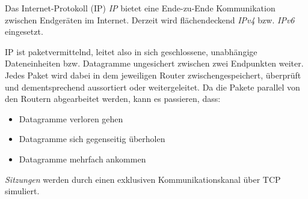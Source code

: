\begin{defi}{Das Internet-Protokoll (IP)}
    \emph{IP} bietet eine Ende-zu-Ende Kommunikation zwischen Endgeräten im Internet.
    Derzeit wird flächendeckend \emph{IPv4} bzw. \emph{IPv6} eingesetzt.

    IP ist paketvermittelnd, leitet also in sich geschlossene, unabhängige Dateneinheiten bzw. Datagramme ungesichert zwischen zwei Endpunkten weiter.
    Jedes Paket wird dabei in dem jeweiligen Router zwischengespeichert, überprüft und dementsprechend aussortiert oder weitergeleitet.
    Da die Pakete parallel von den Routern abgearbeitet werden, kann es passieren, dass:
    \begin{itemize}
        \item Datagramme verloren gehen
        \item Datagramme sich gegenseitig überholen
        \item Datagramme mehrfach ankommen
    \end{itemize}

    \emph{Sitzungen} werden durch einen exklusiven Kommunikationskanal über TCP simuliert.
\end{defi}